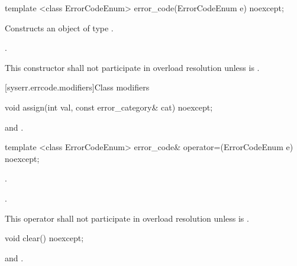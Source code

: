 %
\begin{itemdecl}
template <class ErrorCodeEnum>
  error_code(ErrorCodeEnum e) noexcept;
\end{itemdecl}

\begin{itemdescr}
\pnum
\effects Constructs an object of type .

\pnum
\postconditions {}.

\pnum
\remarks This constructor shall not participate in overload resolution unless\linebreak
{} is .
\end{itemdescr}

[syserr.errcode.modifiers]{Class  modifiers}

%
\begin{itemdecl}
void assign(int val, const error_category& cat) noexcept;
\end{itemdecl}

\begin{itemdescr}
\pnum
\postconditions {} and .
\end{itemdescr}

%
\begin{itemdecl}
template <class ErrorCodeEnum>
    error_code& operator=(ErrorCodeEnum e) noexcept;
\end{itemdecl}

\begin{itemdescr}
\pnum
\postconditions {}.

\pnum
\returns {}.

\pnum
\remarks This operator shall not participate in overload resolution unless\linebreak
{} is .
\end{itemdescr}

%
\begin{itemdecl}
void clear() noexcept;
\end{itemdecl}

\begin{itemdescr}
\pnum
\postconditions {} and .
\end{itemdescr}


